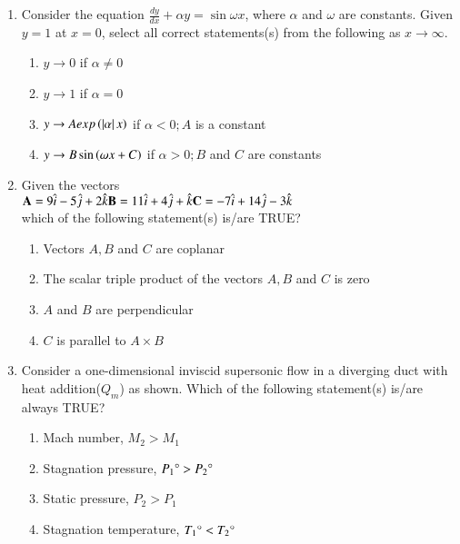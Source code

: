 \documentclass[journal,12pt,onecolumn]{IEEEtran}
\theoremstyle{remark}
\begin{document}
\begin{enumerate}[start=40]
	\item Consider the equation $\frac{dy}{dx}+\alpha y=\sin \omega x$, where $\alpha$ and $\omega$ are constants. Given $y=1$ at $x=0$, select all correct statements(s) from the following as $x \to \infty$.
		\begin{enumerate}
	\item $y\to 0$ if $\alpha\neq0$
	\item $y\to 1$ if $\alpha =0$
	\item $y\to A exp\brak{\abs{\alpha}x}$ if $\alpha<0;A$ is a constant
	\item $y\to B \sin\brak{\omega x+C}$ if $\alpha>0;B$ and $C$ are constants
		\end{enumerate}


	\item Given the vectors \\ $\vec{A}=9\hat{i}-5\hat{j}+2\hat{k}\\ \vec{B}=11\hat{i}+4\hat{j}+\hat{k}\\ \vec{C}=-7\hat{i}+14\hat{j}-3\hat{k}$\\ which of the following statement(s) is/are TRUE?
		\begin{enumerate}
		\item Vectors $A,B$ and $C$ are coplanar
		\item The scalar triple product of the vectors $A,B$ and $C$ is zero
		\item $A$ and $B$ are perpendicular
		\item $C$ is parallel to $A \times B$
		\end{enumerate}

		
	\item Consider a one-dimensional inviscid supersonic flow in a diverging duct with heat addition($Q_m$) as shown. Which of the following statement(s) is/are always TRUE?\\
		\begin{center}
\end{center}
		\begin{enumerate}
			\item Mach number, $M_2>M_1$
			\item Stagnation pressure, $P_1\degree>P_2\degree$
			\item Static pressure, $P_2>P_1$
			\item Stagnation temperature, $T_1\degree<T_2\degree$
		\end{enumerate}


\end{enumerate}
\end{document}
